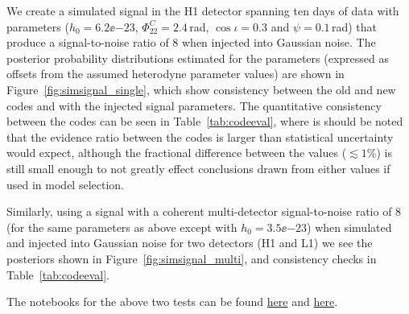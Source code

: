 We create a simulated signal in the H1 detector spanning ten days of data with parameters ($h_0 = 6.2\ee{-23}$, $\Phi_{22}^C = 2.4$\,rad, $\cos{\iota} = 0.3$
and $\psi = 0.1$\,rad) that produce a signal-to-noise ratio of 8 when injected into
Gaussian noise. The posterior probability distributions estimated for the parameters (expressed as offsets from the assumed heterodyne parameter values) are
shown in Figure~\ref{fig:simsignal_single}, which show consistency
between the old and new codes and with the injected signal parameters. The quantitative consistency between the codes can be seen in Table~\ref{tab:codeeval},
where is should be noted that the evidence ratio between the codes is larger than statistical uncertainty would expect, although the fractional difference between
the values ($\lesssim 1\%$) is still small enough to not greatly effect conclusions drawn from either values if used in model selection.

Similarly, using a signal with a coherent multi-detector signal-to-noise ratio of 8 (for the same parameters as above except with $h_0 = 3.5\ee{-23}$) when
simulated and injected into Gaussian noise for two detectors (H1
and L1) we see the posteriors shown in Figure~\ref{fig:simsignal_multi}, and consistency checks in Table~\ref{tab:codeeval}.

The notebooks for the above two tests can be found \href{https://github.com/mattpitkin/CW_nested_sampling_doc/blob/master/figures/codeeval/simulations/signal/SimulatedSignalTestsPaper.ipynb}{here} and 
\href{https://github.com/mattpitkin/CW_nested_sampling_doc/blob/master/figures/codeeval/simulations/signal_multidet/SimulatedSignalMultidetTestsPaper.ipynb}{here}.
